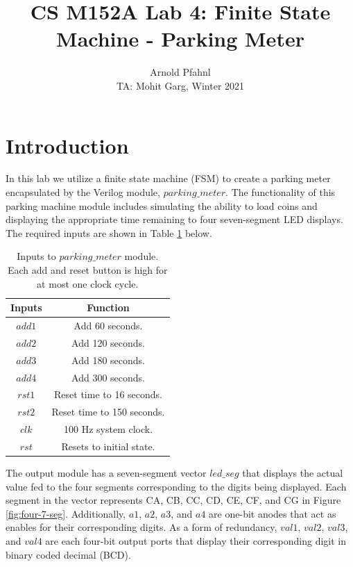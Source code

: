 \documentclass{article}
\title{CS M152A Lab 4: Finite State Machine - Parking Meter}
\author{Arnold Pfahnl \\ \small{TA: Mohit Garg, Winter 2021}}
\date{}
\begin{document}
\maketitle
\tableofcontents

\section{Introduction}
In this lab we utilize a finite state machine (FSM) to create a parking meter encapsulated by the Verilog module, $parking\_meter$. The functionality of this parking machine module includes simulating the ability to load coins and displaying the appropriate time remaining to four seven-segment LED displays. The required inputs are shown in Table \ref{table:inputs} below.

\begin{table}[H]
    \centering
    \begin{tabular}{ | c | c | }
        \hline
        \textbf{Inputs} & \textbf{Function}\\
        \hline
        $add1$ & Add 60 seconds. \\
        \hline
        $add2$ & Add 120 seconds. \\
        \hline
        $add3$ & Add 180 seconds. \\
        \hline
        $add4$ & Add 300 seconds. \\
        \hline
        $rst1$ & Reset time to 16 seconds. \\
        \hline
        $rst2$ & Reset time to 150 seconds. \\
        \hline
        $clk$ & 100 Hz system clock. \\
        \hline
        $rst$ & Resets to initial state.\\
        \hline
    \end{tabular}
    \caption{Inputs to $parking\_meter$ module. Each add and reset button is high for at most one clock cycle.}
    \label{table:inputs}
\end{table}

The output module has a seven-segment vector $led\_seg$ that displays the actual value fed to the four segments corresponding to the digits being displayed. Each segment in the vector represents CA, CB, CC, CD, CE, CF, and CG in Figure \ref{fig:four-7-seg}. Additionally, $a1$, $a2$, $a3$, and $a4$ are one-bit anodes that act as enables for their corresponding digits. As a form of redundancy, $val1$, $val2$, $val3$, and $val4$ are each four-bit output ports that display their corresponding digit in binary coded decimal (BCD).
\end{document}
